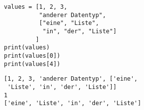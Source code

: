 \begin{frame}[fragile]
%
\begin{tcbraster}[raster columns=2,
                  raster equal height,
                  nobeforeafter,
                  raster column skip=0.5cm]
\begin{codebox}
\begin{verbatim}
values = [1, 2, 3, 
          "anderer Datentyp", 
          ["eine", "Liste", 
           "in", "der", "Liste"]
         ]
print(values)
print(values[0])
print(values[4])
\end{verbatim}
\end{codebox}
%
\begin{cmdbox}[Ausgabe]
\begin{verbatim}
[1, 2, 3, 'anderer Datentyp', ['eine', 
 'Liste', 'in', 'der', 'Liste']]
1
['eine', 'Liste', 'in', 'der', 'Liste']
\end{verbatim}
\end{cmdbox}
\end{tcbraster}
%
\end{frame}


